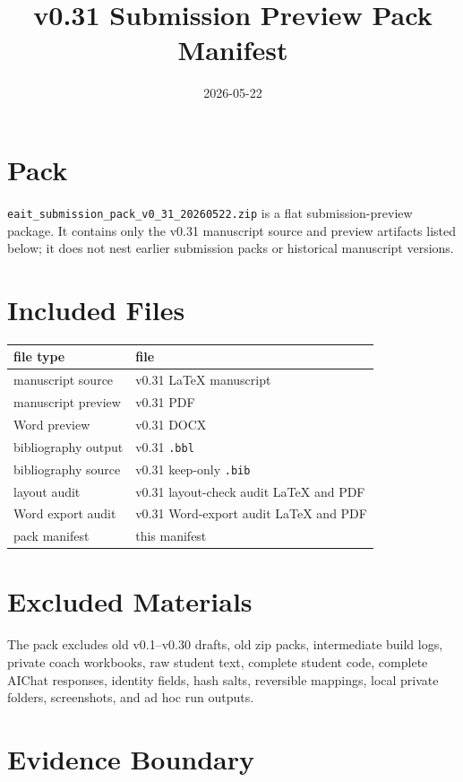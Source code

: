 \documentclass[11pt]{article}
\title{v0.31 Submission Preview Pack Manifest}
\author{}
\date{2026-05-22}
\begin{document}
\maketitle

\section*{Pack}

\texttt{eait\_submission\_pack\_v0\_31\_20260522.zip} is a flat submission-preview package. It contains only the v0.31 manuscript source and preview artifacts listed below; it does not nest earlier submission packs or historical manuscript versions.

\section*{Included Files}

\begin{tabular}{ll}
\toprule
file type & file \\
\midrule
manuscript source & v0.31 \LaTeX{} manuscript \\
manuscript preview & v0.31 PDF \\
Word preview & v0.31 DOCX \\
bibliography output & v0.31 \texttt{.bbl} \\
bibliography source & v0.31 keep-only \texttt{.bib} \\
layout audit & v0.31 layout-check audit \LaTeX{} and PDF \\
Word export audit & v0.31 Word-export audit \LaTeX{} and PDF \\
pack manifest & this manifest \\
\bottomrule
\end{tabular}

\section*{Excluded Materials}

The pack excludes old v0.1--v0.30 drafts, old zip packs, intermediate build logs, private coach workbooks, raw student text, complete student code, complete AIChat responses, identity fields, hash salts, reversible mappings, local private folders, screenshots, and ad hoc run outputs.

\section*{Evidence Boundary}
\end{document}
